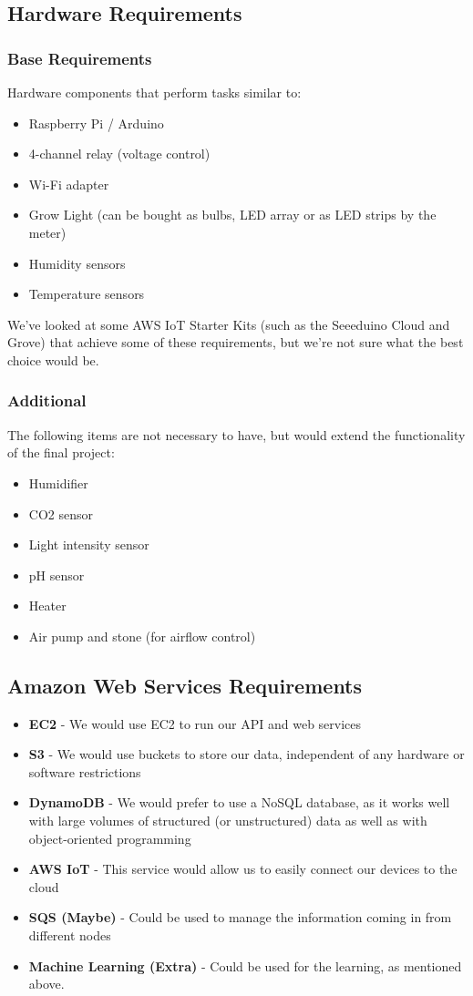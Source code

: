 \documentclass{article}
\begin{document}
	\subsection{Hardware Requirements}
		\subsubsection{Base Requirements}
			Hardware components that perform tasks similar to:
			\begin{itemize}
				\item Raspberry Pi / Arduino
				\item 4-channel relay (voltage control)
				\item Wi-Fi adapter
				\item Grow Light (can be bought as bulbs, LED array or as LED strips by the meter)
				\item Humidity sensors
				\item Temperature sensors
			\end{itemize}
			We've looked at some AWS IoT Starter Kits (such as the Seeeduino Cloud and Grove) that achieve some of these requirements, but we're not sure what the best choice would be.
		\subsubsection{Additional}
			The following items are not necessary to have, but would extend the functionality of the final project:
			\begin{itemize}
				\item Humidifier
				\item CO2 sensor
				\item Light intensity sensor
				\item pH sensor
				\item Heater
				\item Air pump and stone (for airflow control)
			\end{itemize}
	\subsection{Amazon Web Services Requirements}
		\begin{itemize}
			\item \textbf{EC2} - We would use EC2 to run our API and web services
			\item \textbf{S3} - We would use buckets to store our data, independent of any hardware or software restrictions
			\item \textbf{DynamoDB} - We would prefer to use a NoSQL database, as it works well with large volumes of structured (or unstructured) data as well as with object-oriented programming
			\item \textbf{AWS IoT} - This service would allow us to easily connect our devices to the cloud
			\item \textbf{SQS (Maybe)} - Could be used to manage the information coming in from different nodes
			\item \textbf{Machine Learning (Extra)} - Could be used for the learning, as mentioned above.
		\end{itemize}
\end{document}
